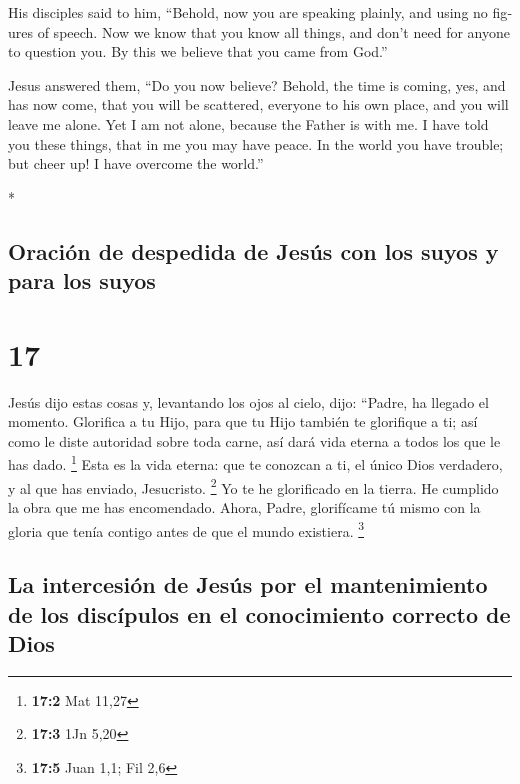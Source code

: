 \begin{paracol}{2}
\begin{otherlanguage}{english}
 His disciples said to him, ``Behold, now you are
speaking plainly, and using no figures of speech.  Now we
know that you know all things, and don't need for anyone to question
you. By this we believe that you came from God.''

 Jesus answered them, ``Do you now believe?
 Behold, the time is coming, yes, and has now come, that
you will be scattered, everyone to his own place, and you will leave me
alone. Yet I am not alone, because the Father is with me.
 I have told you these things, that in me you may have
peace. In the world you have trouble; but cheer up! I have overcome the
world.''

\end{otherlanguage}

\switchcolumn[0]*

\hypertarget{oraciuxf3n-de-despedida-de-jesuxfas-con-los-suyos-y-para-los-suyos}{%
\subsection{Oración de despedida de Jesús con los suyos y para los
suyos}\label{oraciuxf3n-de-despedida-de-jesuxfas-con-los-suyos-y-para-los-suyos}}

\hypertarget{section-32}{%
\section{17}\label{section-32}}

 Jesús dijo estas cosas y, levantando los ojos al cielo,
dijo: ``Padre, ha llegado el momento. Glorifica a tu Hijo, para que tu
Hijo también te glorifique a ti;  así como le diste
autoridad sobre toda carne, así dará vida eterna a todos los que le has
dado. \footnote{\textbf{17:2} Mat 11,27}  Esta es la vida
eterna: que te conozcan a ti, el único Dios verdadero, y al que has
enviado, Jesucristo. \footnote{\textbf{17:3} 1Jn 5,20}  Yo
te he glorificado en la tierra. He cumplido la obra que me has
encomendado.  Ahora, Padre, glorifícame tú mismo con la
gloria que tenía contigo antes de que el mundo existiera. \footnote{\textbf{17:5}
  Juan 1,1; Fil 2,6}

\hypertarget{la-intercesiuxf3n-de-jesuxfas-por-el-mantenimiento-de-los-discuxedpulos-en-el-conocimiento-correcto-de-dios}{%
\subsection{La intercesión de Jesús por el mantenimiento de los
discípulos en el conocimiento correcto de
Dios}\label{la-intercesiuxf3n-de-jesuxfas-por-el-mantenimiento-de-los-discuxedpulos-en-el-conocimiento-correcto-de-dios}}


\end{paracol}
